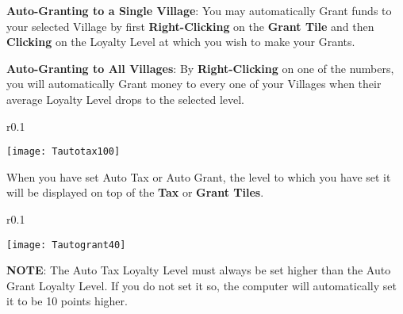 \textbf{Auto-Granting to a Single Village}: You may automatically Grant funds to your selected Village by first \textbf{Right-Clicking} on the \textbf{Grant Tile} and then \textbf{Clicking} on the Loyalty Level at which you wish to make your Grants.

\textbf{Auto-Granting to All Villages}: By \textbf{Right-Clicking} on one of the numbers, you will automatically Grant money to every one of your Villages when their average Loyalty Level drops to the selected level.

\begin{wrapfigure}{r}{0.1\textwidth}
    \vspace{-20pt}
    \begin{center}
        \texttt{[image: Tautotax100]}
    \end{center}
    \vspace{-20pt}
\end{wrapfigure}

When you have set Auto Tax or Auto Grant, the level to which you have set it will be displayed on top of the \textbf{Tax} or \textbf{Grant Tiles}. \\

\begin{wrapfigure}{r}{0.1\textwidth}
    \vspace{-20pt}
    \begin{center}
        \texttt{[image: Tautogrant40]}
    \end{center}
    \vspace{-20pt}
\end{wrapfigure}

\textbf{NOTE}: The Auto Tax Loyalty Level must always be set higher than the Auto Grant Loyalty Level. If you do not set it so, the computer will automatically set it to be 10 points higher.